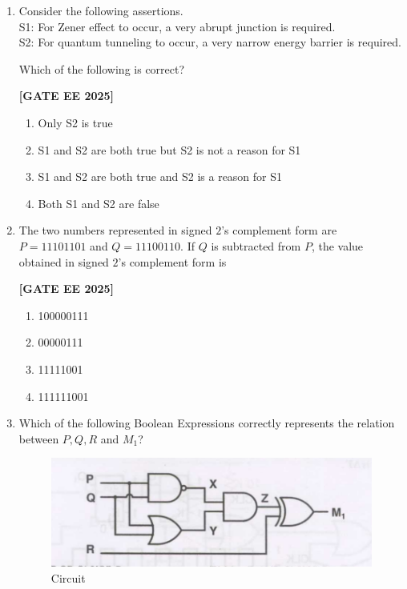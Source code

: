 \documentclass[12pt]{article}
\begin{document}
\begin{enumerate}[leftmargin=*, label=\textbf{Q.\arabic*:}]
\noindent \textbf{[GATE EE 2025]}
\begin{multicols}{4}
\begin{enumerate}
    \item $P$ NOR $Q$
    \item $P$ NAND $Q$
    \item $P$ OR $Q$
    \item $P$ AND $Q$
\end{enumerate}
\end{multicols}

\item Consider the following assertions. \\
S1: For Zener effect to occur, a very abrupt junction is required. \\
S2: For quantum tunneling to occur, a very narrow energy barrier is required.

Which of the following is correct?
 
\noindent \textbf{[GATE EE 2025]}
\begin{enumerate}
    \item Only S2 is true
    \item S1 and S2 are both true but S2 is not a reason for S1
    \item S1 and S2 are both true and S2 is a reason for S1
    \item Both S1 and S2 are false
\end{enumerate}

\item The two numbers represented in signed $2$'s complement form are \\
$P=11101101$ and $Q=11100110$. If $Q$ is subtracted from $P$, the value obtained in signed $2$'s complement form is
 
\noindent \textbf{[GATE EE 2025]}
\begin{multicols}{4}
\begin{enumerate}
    \item 100000111
    \item 00000111
    \item 11111001
    \item 111111001
\end{enumerate}
\end{multicols}

\item Which of the following Boolean Expressions correctly represents the relation between $P, Q, R$ and $M_1$?
\begin{figure}[H]\centering
\includegraphics[width=0.6\columnwidth]{figs/q57.png}
\caption{Circuit}
\label{fig:q57}
\end{figure}
 

\end{enumerate}
\end{document}
